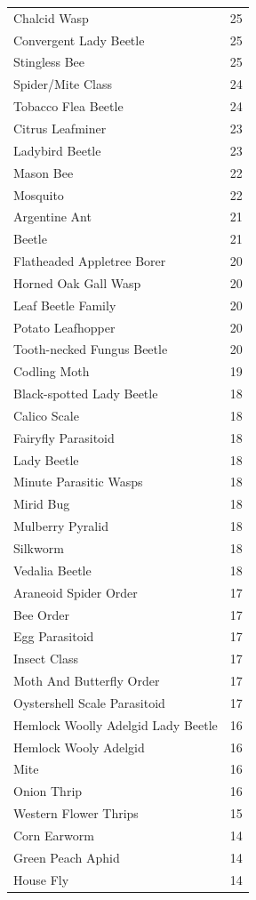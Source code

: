 \documentclass[
  12pt,
]{article}
\begin{document}
\begin{longtable}[]{@{}lr@{}}
Chalcid Wasp & 25 \\
Convergent Lady Beetle & 25 \\
Stingless Bee & 25 \\
Spider/Mite Class & 24 \\
Tobacco Flea Beetle & 24 \\
Citrus Leafminer & 23 \\
Ladybird Beetle & 23 \\
Mason Bee & 22 \\
Mosquito & 22 \\
Argentine Ant & 21 \\
Beetle & 21 \\
Flatheaded Appletree Borer & 20 \\
Horned Oak Gall Wasp & 20 \\
Leaf Beetle Family & 20 \\
Potato Leafhopper & 20 \\
Tooth-necked Fungus Beetle & 20 \\
Codling Moth & 19 \\
Black-spotted Lady Beetle & 18 \\
Calico Scale & 18 \\
Fairyfly Parasitoid & 18 \\
Lady Beetle & 18 \\
Minute Parasitic Wasps & 18 \\
Mirid Bug & 18 \\
Mulberry Pyralid & 18 \\
Silkworm & 18 \\
Vedalia Beetle & 18 \\
Araneoid Spider Order & 17 \\
Bee Order & 17 \\
Egg Parasitoid & 17 \\
Insect Class & 17 \\
Moth And Butterfly Order & 17 \\
Oystershell Scale Parasitoid & 17 \\
Hemlock Woolly Adelgid Lady Beetle & 16 \\
Hemlock Wooly Adelgid & 16 \\
Mite & 16 \\
Onion Thrip & 16 \\
Western Flower Thrips & 15 \\
Corn Earworm & 14 \\
Green Peach Aphid & 14 \\
House Fly & 14 \\

\end{longtable}
\end{document}
